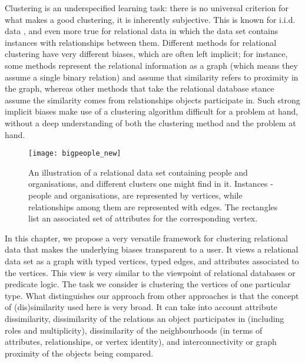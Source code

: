 Clustering is an underspecified learning task: there is no universal criterion for what makes a good clustering, it is inherently subjective.
This is known for i.i.d. data \cite{Estivill-Castro:2002}, and even more true for relational data in which the data set contains instances with relationships between them.
Different methods for relational clustering have very different biases, which are often left implicit; for instance, some methods represent the relational information as a graph (which means they assume a single binary relation) and assume that similarity refers to proximity in the graph, whereas other methods that take the relational database stance assume the similarity comes from relationships objects participate in.
Such strong implicit biases make use of a clustering algorithm difficult for a problem at hand, without a deep understanding of both the clustering method and the problem at hand.

\begin{figure}
  \centering
  \medskip
  \texttt{[image: bigpeople\_new]}
  \caption{An illustration of a relational data set containing people and organisations, and different clusters one might find in it. Instances - people and organisations, are represented by vertices, while relationships among them are represented with edges. The rectangles list an associated set of attributes for the corresponding vertex.}
  \label{fig:clustering:intro}
\end{figure}


In this chapter, we propose a very versatile framework for clustering relational data that makes the underlying biases transparent to a user.
It views a relational data set as a graph with typed vertices, typed edges, and attributes associated to the vertices.
This view is very similar to the viewpoint of relational databases or predicate logic.
The task we consider is clustering the vertices of one particular type.
What distinguishes our approach from other approaches is that the concept of (dis)similarity used here is very broad.
It can take into account attribute dissimilarity, dissimilarity of the relations an object participates in (including roles and multiplicity), dissimilarity of the neighbourhoods (in terms of attributes, relationships, or vertex identity), and interconnectivity or graph proximity of the objects being compared.


